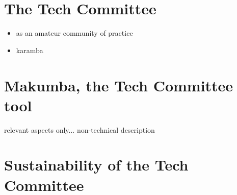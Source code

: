 \documentclass{acm_proc_article-sp}
\begin{document}
\section{The Tech Committee}\label{sec:itc}
\begin{itemize}
\item as an amateur community of practice
\item karamba
\end{itemize}

\section{Makumba, the Tech Committee tool}\label{sec:makumba}
relevant aspects only... non-technical description

\section{Sustainability of the Tech Committee}
\end{document}
